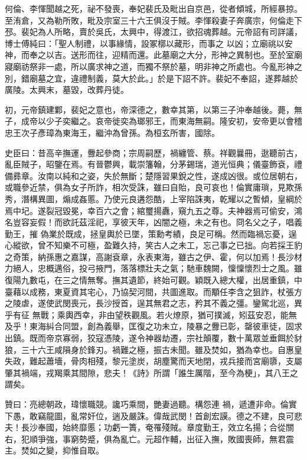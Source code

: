 \begin{pinyinscope}
 何倫、李惲聞越之死，祕不發喪，奉妃裴氏及毗出自京邑，從者傾城，所經暴掠。至洧倉，又為勒所敗，毗及宗室三十六王俱沒于賊。李惲殺妻子奔廣宗，何倫走下邳。裴妃為人所略，賣於吳氏，太興中，得渡江，欲招魂葬越。元帝詔有司詳議，博士傅純曰：「聖人制禮，以事緣情，設冢槨以藏形，而事之
 以凶；立廟祧以安神，而奉之以吉。送形而往，迎精而還。此墓廟之大分，形神之異制也。至於室廟寢廟祊祭非一處，所以廣求神之道，而獨不祭於墓，明非神之所處也。今亂形神之別，錯廟墓之宜，違禮制義，莫大於此。」於是下詔不許。裴妃不奉詔，遂葬越於廣陵。太興末，墓毀，改葬丹徒。



 初，元帝鎮建鄴，裴妃之意也，帝深德之，數幸其第，以第三子沖奉越後。薨，無子，成帝以少子奕繼之。哀帝徙奕為瑯邪王，而東海無嗣。隆安初，安帝更以會稽忠王次子彥璋為東海王，繼沖為曾孫。為桓玄所害，國除。



 史臣曰：昔高辛撫運，釁起參商；宗周嗣歷，禍纏管、蔡。祥觀曩冊，逖聽前古，亂臣賊子，昭鑒在焉。有晉鬱興，載崇籓翰，分茅錫瑞，道光恒典；儀臺飾袞，禮備彞章。汝南以純和之姿，失於無斷；楚隱習果銳之性，遂成凶很。或位居朝右，或職參近禁，俱為女子所詐，相次受誅，雖曰自貽，良可哀也！倫實庸瑣，見欺孫秀，潛構異圖，煽成姦慝。乃使元良遘怨酷，上宰陷誅夷，乾耀以之暫傾，皇綱於焉中圮。遂裂冠毀冕，幸百六之會；綰璽揚纛，窺九五之尊。夫神器焉可偷安，鴻名豈容妄假！而欲託茲淫祀，享彼天年，凶闇之極，未之有也。冏名父之子，唱義勤王，摧
 偽業於既成，拯皇輿於已墜，策勳考績，良足可稱。然而臨禍忘憂，逞心縱欲，曾不知樂不可極，盈難久持，笑古人之未工，忘己事之已拙。向若採王豹之奇策，納孫惠之嘉謀，高謝袞章，永表東海，雖古之伊、霍，何以加焉！長沙材力絕人，忠概邁俗，投弓掖門，落落標壯夫之氣；馳車魏闕，懍懍懷烈士之風。雖復陽九數屯，在三之情無奪。撫其遺節，終始可觀。穎既入總大權，出居重鎮，中臺藉以成務，東夏資其宅心，乃協契河間，共圖進取。而顒任李含之狙詐，杖張方之陵虐，遂使武閔喪元，長沙授首，逞其無君之志，矜其不義之彊。鑾駕北巡，異乎有征
 無戰；乘輿西幸，非由望秩觀風。若火燎原，猶可撲滅，矧茲安忍，能無及乎！東海糾合同盟，創為義舉，匡復之功未立，陵暴之釁已彰，罄彼車徒，固求出鎮。既而帝京寡弱，狡寇憑陵，遂令神器劫遷，宗社顛覆，數十萬眾並垂餌於豺狼，三十六王咸隕身於鋒刃。禍難之極，振古未聞。雖及焚如，猶為幸也。自惠皇失政，難起蕭墻，骨肉相殘，黎元塗炭，胡塵驚而天地閉，戎兵接而宮廟隳，支屬肇其禍端，戎羯乘其間隙，悲夫！《詩》所謂「誰生厲階，至今為梗」，其八王之謂矣。



 贊曰：亮總朝政，瑋懷職競。讒巧乘間，艷妻過聽。構怨連
 禍，遞遭非命。倫實下愚，敢竊龍圖，亂常奸位，遄及嚴誅。偉哉武閔！首創宏謨。德之不建，良可悲夫！長沙奉國，始終靡慝；功虧一簣，奄罹殘賊。章度勤王，效立名揚；合從關右，犯順爭強，事窮勢蹙，俱為亂亡。元超作輔，出征入撫，敗國喪師，無君震主。焚如之變，抑惟自取。



\end{pinyinscope}